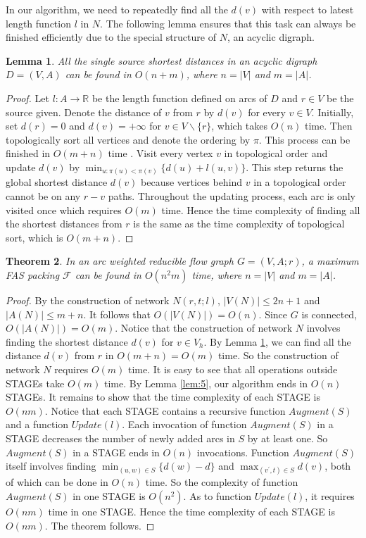 \documentclass[11pt]{article}
\newtheorem{theorem}{Theorem}[section]
\newtheorem{lemma}[theorem]{Lemma}
\begin{document}
In our algorithm, we need to repeatedly find all the $d(v)$ with respect to latest length function $l$ in $N$. The following lemma ensures that this task can always be finished efficiently due to the special structure of $N$, an acyclic digraph.

\begin{lemma}
\label{lem:6}
All the single source shortest distances in an acyclic digraph $D=(V,A)$ can be found in $O(n+m)$, where $n=\lvert V \rvert$ and $m=\lvert A \rvert$.
\end{lemma}
\begin{proof}
Let $l:A\rightarrow \mathbb{R}$ be the length function defined on arcs of $D$ and $r\in V$ be the source given. Denote the distance of $v$ from $r$ by $d(v)$ for every $v\in V$. Initially, set $d(r)=0$ and $d(v)=+\infty$ for $v\in V\backslash \{r\}$, which takes $O(n)$ time. Then topologically sort all vertices and denote the ordering by $\pi$. This process can be finished in $O(m+n)$ time \cite{AhMO}. Visit every vertex $v$ in topological order and update $d(v)$ by $\min_{u:\pi(u)<\pi(v)}\{d(u)+l(u,v)\}$. This step returns the global shortest distance $d(v)$ because vertices behind $v$ in a topological order cannot be on any $r-v$ paths. Throughout the updating process, each arc is only visited once which requires $O(m)$ time. Hence the time complexity of finding all the shortest distances from $r$ is the same as the time complexity of topological sort, which is $O(m+n)$.
\end{proof}

\begin{theorem}
\label{thm:5}
In an arc weighted reducible flow graph $G=(V,A;r)$, a maximum FAS packing $\mathcal{F}$ can be found in $O(n^2 m)$ time, where $n=\lvert V \rvert$ and $m=\lvert A \rvert$.
\end{theorem}
\begin{proof}
By the construction of network $N(r,t;l)$, $\lvert V(N)\rvert\leq 2n+1$ and $\lvert A(N)\rvert\leq m+n$. It follows that $O(\lvert V(N)\rvert)=O(n)$. Since $G$ is connected, $O(\lvert A(N)\rvert)=O(m)$. Notice that the construction of network $N$ involves finding the shortest distance $d(v)$ for $v\in V_h$. By Lemma \ref{lem:6}, we can find all the distance $d(v)$ from $r$ in $O(m+n)=O(m)$ time. So the construction of network $N$ requires $O(m)$ time. It is easy to see that all operations outside STAGEs take $O(m)$ time. By Lemma \ref{lem:5}, our algorithm ends in $O(n)$ STAGEs. It remains to show that the time complexity of each STAGE is $O(nm)$. Notice that each STAGE contains a recursive function $Augment(S)$ and a function $Update(l)$. Each invocation of function $Augment(S)$ in a STAGE decreases the number of newly added arcs in $S$ by at least one. So $Augment(S)$ in a STAGE ends in $O(n)$ invocations. Function $Augment(S)$ itself involves finding $\min_{(u,w)\in S}\{d(w)-d\}$ and $\max_{(v^\prime,t)\in S} d(v)$, both of which can be done in $O(n)$ time. So the complexity of function $Augment(S)$ in one STAGE is $O(n^2)$. As to function $Update(l)$, it requires $O(nm)$ time in one STAGE. Hence the time complexity of each STAGE is $O(nm)$. The theorem follows.
\end{proof}
\end{document}
